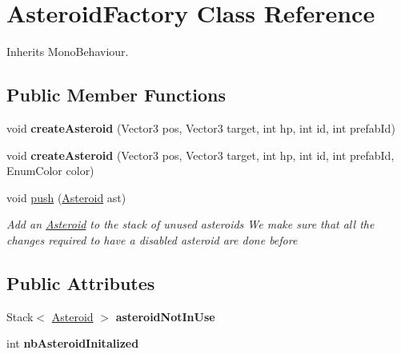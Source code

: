 \hypertarget{class_asteroid_factory}{\section{Asteroid\-Factory Class Reference}
\label{class_asteroid_factory}
}


Inherits Mono\-Behaviour.

\subsection*{Public Member Functions}
\begin{DoxyCompactItemize}
\item 
\hypertarget{class_asteroid_factory_a78984d458a97ddc6329cf88ca03a2a87}{void {\bfseries create\-Asteroid} (Vector3 pos, Vector3 target, int hp, int id, int prefab\-Id)}\label{class_asteroid_factory_a78984d458a97ddc6329cf88ca03a2a87}

\item 
\hypertarget{class_asteroid_factory_adbbd439527cd55df96e44bc6db5c37b1}{void {\bfseries create\-Asteroid} (Vector3 pos, Vector3 target, int hp, int id, int prefab\-Id, Enum\-Color color)}\label{class_asteroid_factory_adbbd439527cd55df96e44bc6db5c37b1}

\item 
void \hyperlink{class_asteroid_factory_a3b01af7d248f0943afc1b053d65d4637}{push} (\hyperlink{class_asteroid}{Asteroid} ast)
\begin{DoxyCompactList}\small\item\em Add an \hyperlink{class_asteroid}{Asteroid} to the stack of unused asteroids We make sure that all the changes required to have a disabled asteroid are done before \end{DoxyCompactList}\end{DoxyCompactItemize}
\subsection*{Public Attributes}
\begin{DoxyCompactItemize}
\item 
\hypertarget{class_asteroid_factory_ab49cbc98fddf3f74b3486dec724c3598}{Stack$<$ \hyperlink{class_asteroid}{Asteroid} $>$ {\bfseries asteroid\-Not\-In\-Use}}\label{class_asteroid_factory_ab49cbc98fddf3f74b3486dec724c3598}

\item 
\hypertarget{class_asteroid_factory_a1bc00d79ced5d807cec2361a954dae9f}{int {\bfseries nb\-Asteroid\-Initalized}}\label{class_asteroid_factory_a1bc00d79ced5d807cec2361a954dae9f}

\end{DoxyCompactItemize}
